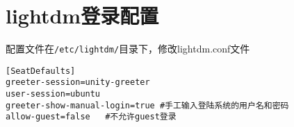 \section{lightdm登录配置}
配置文件在\verb+/etc/lightdm/+目录下，修改lightdm.conf文件
\begin{verbatim}
[SeatDefaults]
greeter-session=unity-greeter
user-session=ubuntu
greeter-show-manual-login=true #手工输入登陆系统的用户名和密码
allow-guest=false   #不允许guest登录
\end{verbatim}


